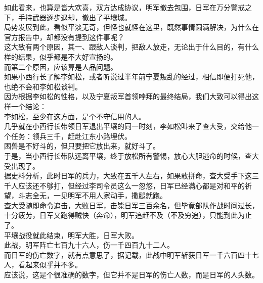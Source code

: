 \begin{multicols}{\theparacolNo}
如此看来，也算是皆大欢喜，双方达成协议，明军撤去包围，日军在万分警戒之下，手持武器逐步退却，撤出了平壤城。\\

局势发展到此，看似平淡无奇，但怪也就怪在这里，既然事情圆满解决，为什么在官方报告中，却都没有提到这件事呢？\\

这大致有两个原因，其一、跟敌人谈判，把敌人放走，无论出于什么目的，有什么样的结果，似乎都是不大好宣扬的。\\

而第二个原因，应该算是人品问题。\\

如果小西行长了解李如松，或者听说过半年前宁夏叛乱的经过，相信即便打死他，也绝不会和李如松谈判。\\

因为根据李如松的性格，以及宁夏叛军首领哱拜的最终结局，我们大致可以得出这样一个结论：\\

李如松，至少在这方面，是个不守信用的人。\\

几乎就在小西行长带领日军退出平壤的同一时刻，李如松叫来了查大受，交给他一个任务：领兵三千，赶赴江东小路埋伏。\\

困兽是不好斗的，但只要把它放出来，就好斗了。\\

于是，当小西行长带队远离平壤，终于放松所有警惕，放心大胆逃命的时候，查大受出现了。\\

据史料分析，此时日军的兵力，大致在五千人左右，如果敢拼命，查大受手下这三千人应该还不够打，但经过李司令员这么一忽悠，日军已经满心都是对和平的祈望，斗志全无，一见明军不用人家动手，撒腿就跑。\\

查大受随即命令追击，大败日军，击毙日军三百余名，但毕竟部队作战时间过长，十分疲劳，日军又跑得贼快（奔命），明军追赶不及（不及穷追），只能到此为止了。\\

平壤战役就此结束，明军大胜，日军大败。\\

此战，明军阵亡七百九十六人，伤一千四百九十二人。\\

而日军的伤亡数字，就有点意思了，据记载，此战中明军斩获日军一千六百四十七人，看起来似乎并不多。\\

应该说，这是个很准确的数字，但它并不是日军的伤亡人数，而是日军的人头数。\\


\end{multicols}

